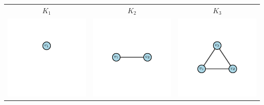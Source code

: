         \begin{table}[h!]
            \begin{center}
                \begin{tabular}{ccc}
                
                    \textbf{$K_1$} & \textbf{$K_2$} & \textbf{$K_3$} \\
                    \includegraphics{Sections/Graphs/GraphsImages/GraphsKn/K1.pdf}
                    \centering 
                    &
                    \includegraphics{Sections/Graphs/GraphsImages/GraphsKn/K2.pdf}
                    &
                    \includegraphics{Sections/Graphs/GraphsImages/GraphsKn/K3.pdf}

\end{tabular}
\end{center}
\end{table}
